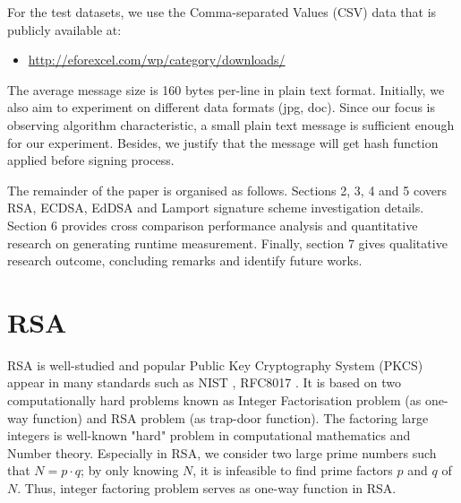 \documentclass[10pt,sigconf]{acmart}
\newcommand{\Z}{\mathbb{Z}}
\begin{document}
\noindent For the test datasets, we use the Comma-separated Values (CSV) data that is publicly available at:
\begin{itemize}
    \item \href{http://eforexcel.com/wp/downloads-18-sample-csv-files-data-sets-for-testing-sales/}{http://eforexcel.com/wp/category/downloads/}
\end{itemize}

The average message size is 160 bytes per-line in plain text format. Initially, we also aim to experiment on different data formats (jpg, doc). Since our focus is observing algorithm characteristic, a small plain text message is sufficient enough for our experiment. Besides, we justify that the message will get hash function applied before signing process.

The remainder of the paper is organised as follows. Sections 2, 3, 4 and 5 covers RSA, ECDSA, EdDSA and Lamport signature scheme investigation details. Section 6 provides cross comparison performance analysis and quantitative research on generating runtime measurement. Finally, section 7 gives qualitative research outcome, concluding remarks and identify future works.


\section{RSA}


RSA \cite{Rivest:1978:MOD:359340.359342} is well-studied and popular Public Key Cryptography System (PKCS) appear in many standards such as NIST \cite{Kerry13fipspub}, RFC8017 \cite{rfc8017}. It is based on two computationally hard problems known as Integer Factorisation problem (as one-way function) and RSA problem (as trap-door function). The factoring large integers is well-known "hard" problem in computational mathematics and Number theory. Especially in RSA, we consider two large prime numbers such that $N = p \cdot q$; by only knowing $N$, it is infeasible to find prime factors $p$ and $q$ of $N$. Thus, integer factoring problem serves as one-way function in RSA.
\end{document}
